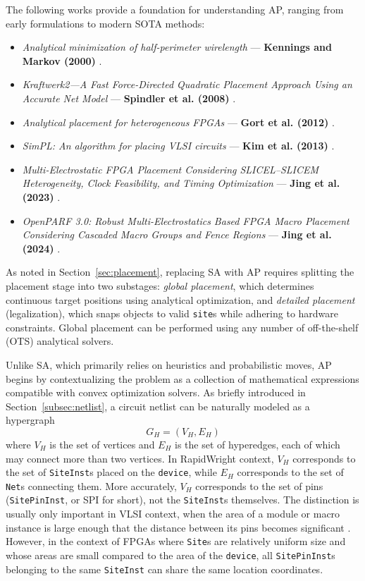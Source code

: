 The following works provide a foundation for understanding AP, ranging from early formulations to modern SOTA methods:
\begin{itemize}
    \item \emph{Analytical minimization of half-perimeter wirelength} — \textbf{Kennings and Markov (2000)} \cite{AP_2000}.
    \item \emph{Kraftwerk2—A Fast Force-Directed Quadratic Placement Approach Using an Accurate Net Model} — \textbf{Spindler et al. (2008)} \cite{kraftwerk2}.
    \item \emph{Analytical placement for heterogeneous FPGAs} — \textbf{Gort et al. (2012)} \cite{AP_2012}.
    \item \emph{SimPL: An algorithm for placing VLSI circuits} — \textbf{Kim et al. (2013)} \cite{SimPL}.
    \item \emph{Multi-Electrostatic FPGA Placement Considering SLICEL–SLICEM Heterogeneity, Clock Feasibility, and Timing Optimization} — \textbf{Jing et al. (2023)} \cite{MultiElectrostatic}.
    \item \emph{OpenPARF 3.0: Robust Multi-Electrostatics Based FPGA Macro Placement Considering Cascaded Macro Groups and Fence Regions} — \textbf{Jing et al. (2024)} \cite{OpenPARF}.
\end{itemize}

As noted in Section~\ref{sec:placement}, replacing SA with AP requires splitting the placement stage into two substages:  
\emph{global placement}, which determines continuous target positions using analytical optimization, and  
\emph{detailed placement} (legalization), which snaps objects to valid \texttt{site}s while adhering to hardware constraints.  
Global placement can be performed using any number of off-the-shelf (OTS) analytical solvers.

Unlike SA, which primarily relies on heuristics and probabilistic moves, AP begins by contextualizing the problem as a collection of mathematical expressions compatible with convex optimization solvers.
As briefly introduced in Section~\ref{subsec:netlist}, a circuit netlist can be naturally modeled as a hypergraph
\begin{equation}
    G_{H} = (V_{H}, E_{H})
    \label{equ:hypergraph}
\end{equation}
where \(V_{H}\) is the set of vertices and \(E_{H}\) is the set of hyperedges, each of which may connect more than two vertices. 
In RapidWright context, \(V_{H}\) corresponds to the set of \texttt{SiteInst}s placed on the \texttt{device}, while \(E_{H}\) corresponds to the set of \texttt{Net}s connecting them.
More accurately, $V_H$ corresponds to the set of pins (\texttt{SitePinInst}, or SPI for short), not the \texttt{SiteInst}s themselves.
The distinction is usually only important in VLSI context, when the area of a module or macro instance is large enough that the distance between its pins becomes significant \cite{kraftwerk2}.
However, in the context of FPGAs where \texttt{Site}s are relatively uniform size and whose areas are small compared to the area of the \texttt{device}, all \texttt{SitePinInst}s belonging to the same \texttt{SiteInst} can share the same location coordinates.



